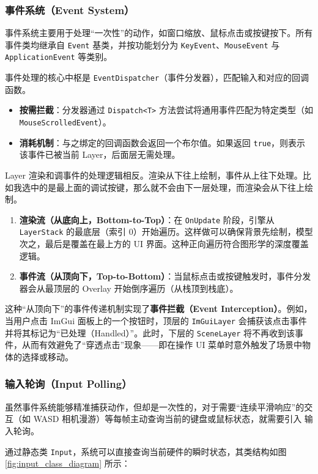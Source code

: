 \subsubsection{事件系统（Event System）}
事件系统主要用于处理“一次性”的动作，如窗口缩放、鼠标点击或按键按下。所有事件类均继承自 \texttt{Event} 基类，并按功能划分为 \texttt{KeyEvent}、\texttt{MouseEvent} 与 \texttt{ApplicationEvent} 等类别。

事件处理的核心中枢是 \texttt{EventDispatcher}（事件分发器），匹配输入和对应的回调函数。
\begin{itemize}
    \item \textbf{按需拦截}：分发器通过 \texttt{Dispatch<T>} 方法尝试将通用事件匹配为特定类型（如 \texttt{MouseScrolledEvent}）。
    \item \textbf{消耗机制}：与之绑定的回调函数会返回一个布尔值。如果返回 \texttt{true}，则表示该事件已被当前 Layer，后面层无需处理。
\end{itemize}

Layer 渲染和调事件的处理逻辑相反。渲染从下往上绘制，事件从上往下处理。比如我选中的是最上面的调试按键，那么就不会由下一层处理，而渲染会从下往上绘制。
\begin{enumerate}
    \item \textbf{渲染流（从底向上，Bottom-to-Top）}：在 \texttt{OnUpdate} 阶段，引擎从 \texttt{LayerStack} 的最底层（索引 0）开始遍历。这样做可以确保背景先绘制，模型次之，最后是覆盖在最上方的 UI 界面。这种正向遍历符合图形学的深度覆盖逻辑。
    \item \textbf{事件流（从顶向下，Top-to-Bottom）}：当鼠标点击或按键触发时，事件分发器会从最顶层的 Overlay 开始倒序遍历（从栈顶到栈底）。
\end{enumerate}
这种“从顶向下”的事件传递机制实现了\textbf{事件拦截（Event Interception）}。例如，当用户点击 ImGui 面板上的一个按钮时，顶层的 \texttt{ImGuiLayer} 会捕获该点击事件并将其标记为“已处理（Handled）”。此时，下层的 \texttt{SceneLayer} 将不再收到该事件，从而有效避免了“穿透点击”现象——即在操作 UI 菜单时意外触发了场景中物体的选择或移动。

\subsubsection{输入轮询（Input Polling）}
虽然事件系统能够精准捕获动作，但却是一次性的，对于需要“连续平滑响应”的交互（如 WASD 相机漫游）等每帧主动查询当前的键盘或鼠标状态，就需要引入 输入轮询。

通过静态类 \texttt{Input}，系统可以直接查询当前硬件的瞬时状态，其类结构如图 \ref{fig:input_class_diagram} 所示：

